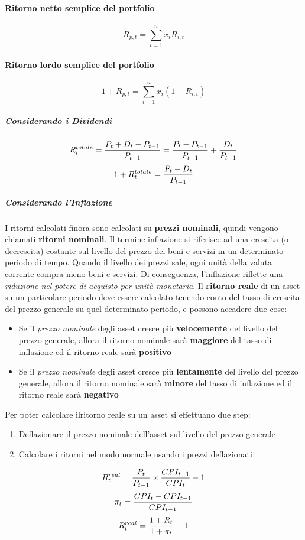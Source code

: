\documentclass[12pt]{article}
\begin{document}
\paragraph{Ritorno netto semplice del portfolio}
$$R_{p,t}=\sum_{i=1}^n x_iR_{i,t}$$
\paragraph{Ritorno lordo semplice del portfolio}
$$1 + R_{p,t}=\sum_{i=1}^n x_i(1 + R_{i,t})$$
\subparagraph{Considerando i Dividendi}
$$R_t^{totale} = {{P_t + D_t - P_{t-1}}\over{P_{t-1}}}={{P_t-P_{t-1}}\over{P_{t-1}}} + {D_t \over{P_{t-1}}}$$
$$1 + R_t^{totale}={{P_t-D_{t}}\over{P_{t-1}}}$$
\subparagraph{Considerando l'Inflazione} I ritorni calcolati finora sono calcolati su \textbf{prezzi nominali}, quindi vengono chiamati \textbf{ritorni nominali}. Il termine inflazione si  riferisce ad una crescita (o decrescita) costante sul livello del prezzo dei beni e servizi in un determinato periodo di tempo. Quando il livello dei prezzi sale, ogni unità della valuta corrente compra meno beni e servizi. Di conseguenza, l’inflazione riflette una \textit{riduzione nel potere di acquisto per unità monetaria}. Il \textbf{ritorno reale} di un asset su un particolare periodo deve essere calcolato tenendo conto del tasso di crescita del prezzo generale su quel determinato periodo, e possono accadere due cose:
\begin{itemize}
    \item Se il \textit{prezzo nominale} degli asset cresce più \textbf{velocemente} del livello del prezzo generale, allora il ritorno nominale sarà \textbf{maggiore} del tasso di inflazione ed il ritorno reale sarà \textbf{positivo}
    \item Se il \textit{prezzo nominale} degli asset cresce più \textbf{lentamente} del livello del prezzo generale, allora il ritorno nominale sarà \textbf{minore} del tasso di inflazione ed il ritorno reale sarà \textbf{negativo}
\end{itemize}
Per poter calcolare ilritorno reale su un asset si effettuano due step:
\begin{enumerate}
    \item Deflazionare il prezzo nominale dell’asset sul livello del prezzo generale
    \item Calcolare i ritorni nel modo normale usando i prezzi deflazionati
\end{enumerate}
$$R_t^{real} = {P_t\over{P_{t-1}}} \times {CPI_{t-1}\over{CPI_{t}}} -1 $$
$$\pi_t={{CPI_t-CPI_{t-1}}\over CPI_{t-1}}$$
$$R_t^{real} = {{1+ R_t}\over{1+\pi_t}}-1$$
\end{document}
